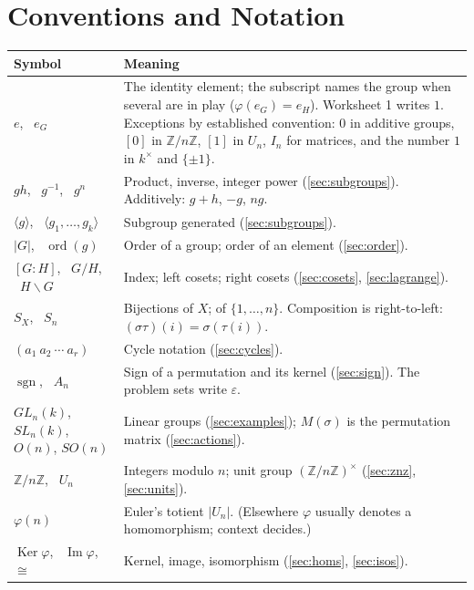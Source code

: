 \documentclass[11pt]{report}
\newcommand{\sgn}{\operatorname{sgn}}
\begin{document}
\chapter*{Conventions and Notation}

{\renewcommand{\arraystretch}{1.3}
\begin{longtable}{p{4.2cm}p{10.3cm}}
\textbf{Symbol} & \textbf{Meaning} \\ \hline
$e$, \ $e_G$ & The identity element; the subscript names the group when several are in play ($\varphi(e_G) = e_H$). Worksheet 1 writes $1$. Exceptions by established convention: $0$ in additive groups, $[0]$ in $\mathbb{Z}/n\mathbb{Z}$, $[1]$ in $U_n$, $I_n$ for matrices, and the number $1$ in $k^\times$ and $\{\pm 1\}$. \\
$gh$, \ $g^{-1}$, \ $g^n$ & Product, inverse, integer power (\ref{sec:subgroups}). Additively: $g + h$, $-g$, $ng$. \\
$\langle g \rangle$, \ $\langle g_1, \ldots, g_k \rangle$ & Subgroup generated (\ref{sec:subgroups}). \\
$|G|$, \ $\operatorname{ord}(g)$ & Order of a group; order of an element (\ref{sec:order}). \\
$[G : H]$, \ $G/H$, \ $H\backslash G$ & Index; left cosets; right cosets (\ref{sec:cosets}, \ref{sec:lagrange}). \\
$S_X$, \ $S_n$ & Bijections of $X$; of $\{1, \ldots, n\}$. Composition is right-to-left: $(\sigma\tau)(i) = \sigma(\tau(i))$. \\
$(a_1\ a_2\ \cdots\ a_r)$ & Cycle notation (\ref{sec:cycles}). \\
$\sgn$, \ $A_n$ & Sign of a permutation and its kernel (\ref{sec:sign}). The problem sets write $\varepsilon$. \\
$GL_n(k)$, $SL_n(k)$, $O(n)$, $SO(n)$ & Linear groups (\ref{sec:examples}); $M(\sigma)$ is the permutation matrix (\ref{sec:actions}). \\
$\mathbb{Z}/n\mathbb{Z}$, \ $U_n$ & Integers modulo $n$; unit group $(\mathbb{Z}/n\mathbb{Z})^\times$ (\ref{sec:znz}, \ref{sec:units}). \\
$\varphi(n)$ & Euler's totient $|U_n|$. (Elsewhere $\varphi$ usually denotes a homomorphism; context decides.) \\
$\operatorname{Ker}\varphi$, \ $\operatorname{Im}\varphi$, \ $\cong$ & Kernel, image, isomorphism (\ref{sec:homs}, \ref{sec:isos}). \\

\end{longtable}}
\end{document}
